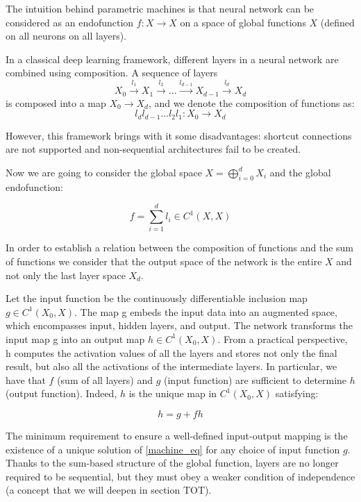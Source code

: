 The intuition behind parametric machines is that neural network can be considered as an endofunction $f : X \to X $ on a space of global functions $X$ (defined on all neurons on all layers). 

In a classical deep learning framework, different layers in a neural network are combined using composition. A sequence of layers
\begin{equation}
    X_0 \xrightarrow{l_1} X_1 \xrightarrow{l_2} ... \xrightarrow{l_{d-1}} X_{d-1} \xrightarrow{l_d} X_d
\end{equation}
is composed into a map $X_0 \to X_d$, and we denote the composition of functions as:
\begin{equation}
    l_dl_{d-1}...l_2l_1 : X_0 \to X_d
\end{equation}

However, this framework brings with it some disadvantages: shortcut connections are not supported and non-sequential architectures fail to be created. 


Now we are going to consider the global space $X = \bigoplus_{i=0}^{d} X_i $ and the global endofunction:

\begin{equation}
    f = \sum_{i=1}^d l_i \in C^1(X,X)
\end{equation}

In order to establish a relation between the composition of functions and the sum of functions we consider that the output space of the network is the entire $X$ and not only the last layer space $X_d$. 

Let the input function be the continuously differentiable inclusion map $g \in C^1(X_0, X)$. The map g embeds the input data into an augmented space, which encompasses input, hidden layers, and output. The network transforms the input map g into an output map $h \in C^1(X_0, X)$. From a practical perspective, h computes the activation values of all the layers and stores not only the final result, but also all the activations of the intermediate layers.
In particular, we have that $f$ (sum of all layers) and $g$ (input function) are sufficient to determine $h$ (output function).
Indeed, $h$ is the unique map in $C^1(X_0,X)$ satisfying:

\begin{equation}
    h = g + fh
    \label{machine_eq}
\end{equation}

The minimum requirement to ensure a well-defined input-output mapping is the existence of a unique solution of \ref{machine_eq} for any choice of input function $g$. Thanks to the sum-based structure of the global function, layers are no longer required to be sequential, but they must obey a weaker condition of independence (a concept that we will deepen in section TOT).

